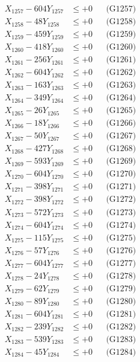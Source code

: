 \documentclass[a4paper,10pt]{article}
\begin{document}
{\begin{align}
X_{1257} - 604Y_{1257} &\leq +0 && \text{(G1257)} \\
X_{1258} - 48Y_{1258} &\leq +0 && \text{(G1258)} \\
X_{1259} - 459Y_{1259} &\leq +0 && \text{(G1259)} \\
X_{1260} - 418Y_{1260} &\leq +0 && \text{(G1260)} \\
\allowbreak
X_{1261} - 256Y_{1261} &\leq +0 && \text{(G1261)} \\
X_{1262} - 604Y_{1262} &\leq +0 && \text{(G1262)} \\
X_{1263} - 163Y_{1263} &\leq +0 && \text{(G1263)} \\
X_{1264} - 349Y_{1264} &\leq +0 && \text{(G1264)} \\
X_{1265} - 26Y_{1265} &\leq +0 && \text{(G1265)} \\
X_{1266} - 18Y_{1266} &\leq +0 && \text{(G1266)} \\
X_{1267} - 50Y_{1267} &\leq +0 && \text{(G1267)} \\
X_{1268} - 427Y_{1268} &\leq +0 && \text{(G1268)} \\
X_{1269} - 593Y_{1269} &\leq +0 && \text{(G1269)} \\
X_{1270} - 604Y_{1270} &\leq +0 && \text{(G1270)} \\
\allowbreak
X_{1271} - 398Y_{1271} &\leq +0 && \text{(G1271)} \\
X_{1272} - 398Y_{1272} &\leq +0 && \text{(G1272)} \\
X_{1273} - 572Y_{1273} &\leq +0 && \text{(G1273)} \\
X_{1274} - 604Y_{1274} &\leq +0 && \text{(G1274)} \\
X_{1275} - 115Y_{1275} &\leq +0 && \text{(G1275)} \\
X_{1276} - 57Y_{1276} &\leq +0 && \text{(G1276)} \\
X_{1277} - 604Y_{1277} &\leq +0 && \text{(G1277)} \\
X_{1278} - 24Y_{1278} &\leq +0 && \text{(G1278)} \\
X_{1279} - 62Y_{1279} &\leq +0 && \text{(G1279)} \\
X_{1280} - 89Y_{1280} &\leq +0 && \text{(G1280)} \\
\allowbreak
X_{1281} - 604Y_{1281} &\leq +0 && \text{(G1281)} \\
X_{1282} - 239Y_{1282} &\leq +0 && \text{(G1282)} \\
X_{1283} - 539Y_{1283} &\leq +0 && \text{(G1283)} \\
X_{1284} - 45Y_{1284} &\leq +0 && \text{(G1284)} \\

\end{align}}
\end{document}
